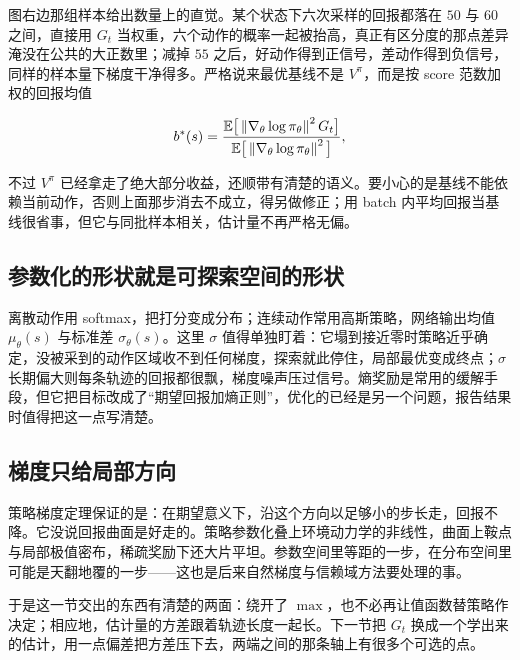 图右边那组样本给出数量上的直觉。某个状态下六次采样的回报都落在 \(50\) 与 \(60\) 之间，直接用 \(G_t\) 当权重，六个动作的概率一起被抬高，真正有区分度的那点差异淹没在公共的大正数里；减掉 \(55\) 之后，好动作得到正信号，差动作得到负信号，同样的样本量下梯度干净得多。严格说来最优基线不是 \(V^\pi\)，而是按 score 范数加权的回报均值

\[
b^*(s)=\frac{\mathbb{E}\big[\left\lVert\nabla_\theta\log\pi_\theta\right\rVert^2G_t\big]}{\mathbb{E}\big[\left\lVert\nabla_\theta\log\pi_\theta\right\rVert^2\big]},
\]

不过 \(V^\pi\) 已经拿走了绝大部分收益，还顺带有清楚的语义。要小心的是基线不能依赖当前动作，否则上面那步消去不成立，得另做修正；用 batch 内平均回报当基线很省事，但它与同批样本相关，估计量不再严格无偏。

\subsection{参数化的形状就是可探索空间的形状}

离散动作用 softmax，把打分变成分布；连续动作常用高斯策略，网络输出均值 \(\mu_\theta(s)\) 与标准差 \(\sigma_\theta(s)\)。这里 \(\sigma\) 值得单独盯着：它塌到接近零时策略近乎确定，没被采到的动作区域收不到任何梯度，探索就此停住，局部最优变成终点；\(\sigma\) 长期偏大则每条轨迹的回报都很飘，梯度噪声压过信号。熵奖励是常用的缓解手段，但它把目标改成了``期望回报加熵正则''，优化的已经是另一个问题，报告结果时值得把这一点写清楚。

\subsection{梯度只给局部方向}

策略梯度定理保证的是：在期望意义下，沿这个方向以足够小的步长走，回报不降。它没说回报曲面是好走的。策略参数化叠上环境动力学的非线性，曲面上鞍点与局部极值密布，稀疏奖励下还大片平坦。参数空间里等距的一步，在分布空间里可能是天翻地覆的一步——这也是后来自然梯度与信赖域方法要处理的事。

于是这一节交出的东西有清楚的两面：绕开了 \(\max\)，也不必再让值函数替策略作决定；相应地，估计量的方差跟着轨迹长度一起长。下一节把 \(G_t\) 换成一个学出来的估计，用一点偏差把方差压下去，两端之间的那条轴上有很多个可选的点。
